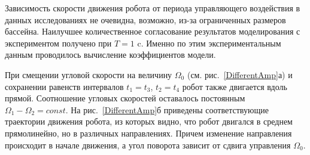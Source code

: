 %




Зависимость скорости движения робота от периода управляющего воздействия в данных исследованиях не очевидна, возможно, из-за ограниченных размеров бассейна. Наилучшее количественное согласование результатов моделирования с экспериментом получено при $T = 1$ c. Именно по этим экспериментальным данным проводилось вычисление коэффициентов модели. 

При смещении угловой скорости на величину $\Omega_0$ (см. рис.~\ref{DifferentAmp}а) и сохранении равенств интервалов $t_1=t_3$, $t_2=t_4$  робот также двигается вдоль прямой.  Соотношение угловых скоростей оставалось постоянным $ \Omega_1 - \Omega_2 = const$.  На рис.~\ref{DifferentAmp}б приведены соответствующие траектории движения робота, из которых видно, что робот двигался в среднем прямолинейно, но в различных направлениях. Причем изменение направления происходит в начале движения, а угол поворота зависит от сдвига управления $\Omega_0$. 


